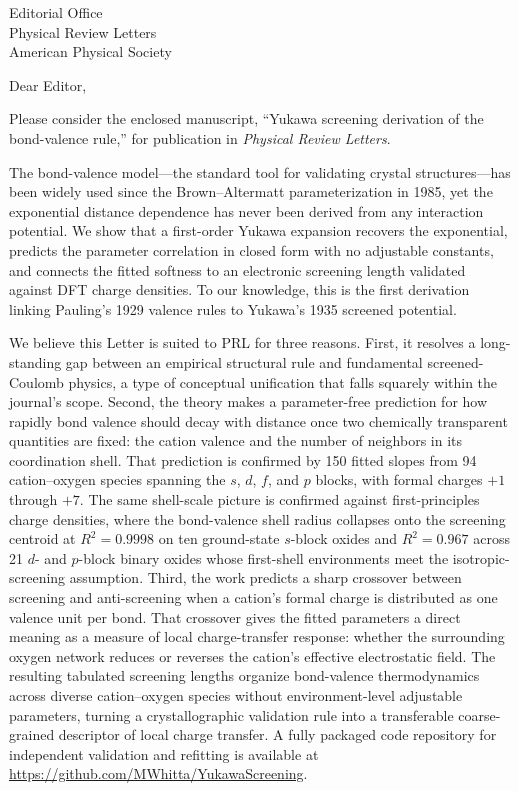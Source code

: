 \documentclass[11pt]{letter}
\begin{document}
\begin{letter}{Editorial Office\\Physical Review Letters\\American Physical Society}

\opening{Dear Editor,}

Please consider the enclosed manuscript, ``Yukawa screening derivation
of the bond-valence rule,'' for publication in \textit{Physical Review
Letters}.

The bond-valence model---the standard tool for validating crystal
structures---has been widely used since the Brown--Altermatt
parameterization in 1985, yet the exponential distance dependence has
never been derived from any interaction potential.  We show that a
first-order Yukawa expansion recovers the exponential, predicts the
parameter correlation in closed form with no adjustable constants, and
connects the fitted softness to an electronic screening length
validated against DFT charge densities.  To our knowledge, this is the
first derivation linking Pauling's 1929 valence rules to Yukawa's 1935
screened potential.

We believe this Letter is suited to PRL for three reasons.  First, it
resolves a long-standing gap between an empirical structural rule and
fundamental screened-Coulomb physics, a type of conceptual unification
that falls squarely within the journal's scope.  Second, the
theory makes a parameter-free prediction for how rapidly bond valence
should decay with distance once two chemically transparent quantities
are fixed: the cation valence and the number of neighbors in its
coordination shell.  That prediction is confirmed by 150 fitted slopes
from 94 cation--oxygen species spanning the $s$, $d$, $f$, and $p$
blocks, with formal charges $+1$ through $+7$. The same shell-scale
picture is confirmed against
first-principles charge densities, where the bond-valence shell radius
collapses onto the screening centroid at $R^2=0.9998$ on ten
ground-state $s$-block oxides and $R^2=0.967$ across 21 $d$- and
$p$-block binary oxides whose first-shell environments meet the
isotropic-screening assumption.
Third,
the work predicts a sharp crossover between screening and anti-screening
when a cation's formal charge is distributed as one valence unit per
bond.  That crossover gives the fitted parameters a direct meaning as a
measure of local charge-transfer response: whether the surrounding
oxygen network reduces or reverses the cation's effective electrostatic
field.  The resulting tabulated screening lengths
organize bond-valence thermodynamics across diverse cation--oxygen
species without environment-level adjustable parameters, turning a
crystallographic validation rule into a transferable coarse-grained
descriptor of local charge transfer.  A fully packaged code
repository for independent validation and refitting is available at
\url{https://github.com/MWhitta/YukawaScreening}.


\end{letter}
\end{document}
